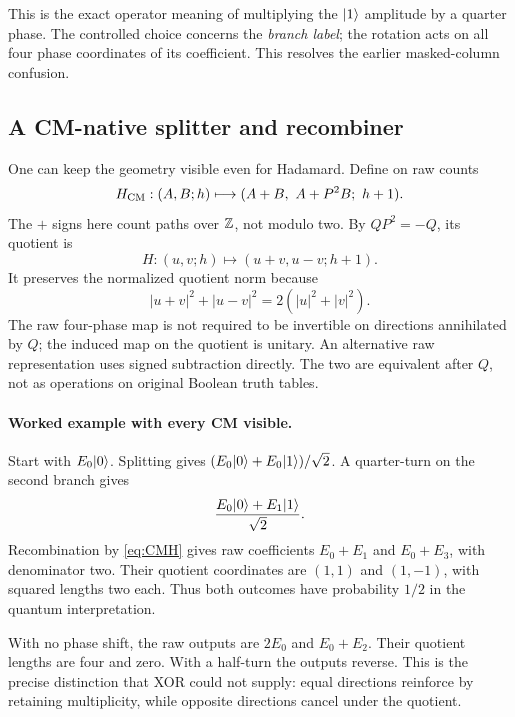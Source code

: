 This is the exact operator meaning of multiplying the $\lvert 1\rangle$ amplitude by a quarter phase. The controlled choice concerns the \emph{branch label}; the rotation acts on all four phase coordinates of its coefficient. This resolves the earlier masked-column confusion.

\subsection{A CM-native splitter and recombiner}
One can keep the geometry visible even for Hadamard. Define on raw counts
\begin{equation}\label{eq:CMH}
 H_{\rm CM}:(A,B;h)\longmapsto(A+B,\ A+P^2B;\ h+1).
\end{equation}
The $+$ signs here count paths over $\mathbb Z$, not modulo two. By $QP^2=-Q$, its quotient is
\begin{equation}
 H:(u,v;h)\longmapsto(u+v,u-v;h+1).
\end{equation}
It preserves the normalized quotient norm because
\begin{equation}
 |u+v|^2+|u-v|^2=2(|u|^2+|v|^2).
\end{equation}
The raw four-phase map is not required to be invertible on directions annihilated by $Q$; the induced map on the quotient is unitary. An alternative raw representation uses signed subtraction directly. The two are equivalent after $Q$, not as operations on original Boolean truth tables.

\paragraph{Worked example with every CM visible.}
Start with $E_0\lvert 0\rangle$. Splitting gives $(E_0\lvert 0\rangle+E_0\lvert 1\rangle)/\sqrt2$. A quarter-turn on the second branch gives
\begin{equation}
 \frac{E_0\lvert 0\rangle+E_1\lvert 1\rangle}{\sqrt2}.
\end{equation}
Recombination by \cref{eq:CMH} gives raw coefficients $E_0+E_1$ and $E_0+E_3$, with denominator two. Their quotient coordinates are $(1,1)$ and $(1,-1)$, with squared lengths two each. Thus both outcomes have probability $1/2$ in the quantum interpretation.

With no phase shift, the raw outputs are $2E_0$ and $E_0+E_2$. Their quotient lengths are four and zero. With a half-turn the outputs reverse. This is the precise distinction that XOR could not supply: equal directions reinforce by retaining multiplicity, while opposite directions cancel under the quotient.

